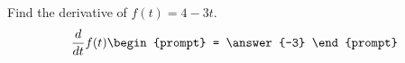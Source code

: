 \documentclass{ximera}
\author{Gregory Hartman \and Matthew Carr}
\begin{document}
\begin{exercise}





Find the derivative of $f(t)=4-3t$.
\[
\frac{d}{dt} f(t)
\begin{prompt} = \answer{-3}
\end{prompt}
\]

\end{exercise}
\end{document}
